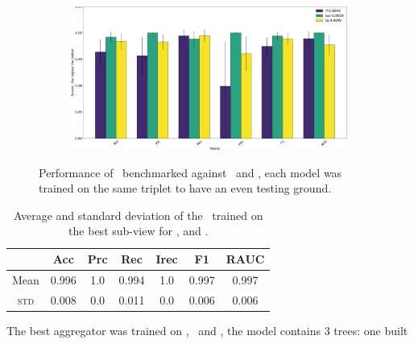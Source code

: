 \begin{figure}[!h]
\begin{subfigure}{0.49\linewidth}
		\subcaption{\an, \cnmod, \phin}
	\end{subfigure}
	\begin{subfigure}{0.49\linewidth}
		\includegraphics[width=\linewidth]{img/Bn_Cnmod_Phi_ta.png}
		\subcaption{\bn, \cnmod, \phin}
	\end{subfigure}
	\caption{Performance of \tas\ benchmarked against \rfs\ and \svcs, each model was trained on
		the same triplet to have an even testing ground.} \label{fig:triplets-performance}
\end{figure}
\begin{table}[!hb]
	\caption{Average and standard deviation of the \ta\ trained on the best sub-view for \an, \bn and
		\cnmod.}\label{tbl:an-bn-cnmod-ta-perf}

	\bigskip
	\setlength{\tabcolsep}{6pt}
	\centering
	\begin{tabular}{ccccccc}
		\toprule
		\textbf{}    & \textbf{Acc} & \textbf{Prc} & \textbf{Rec} & \textbf{Irec} & \textbf{F1} & \textbf{RAUC} \\
		\midrule
		Mean         & 0.996        & 1.0          & 0.994        & 1.0           & 0.997
		             & 0.997                                                                                    \\
		\textsc{std} & 0.008        & 0.0          & 0.011        & 0.0           & 0.006
		             & 0.006                                                                                    \\
		\bottomrule
	\end{tabular}
\end{table}
The best aggregator was trained on \an, \bn\ and \cnmod, the model contains $3$ trees: one built
